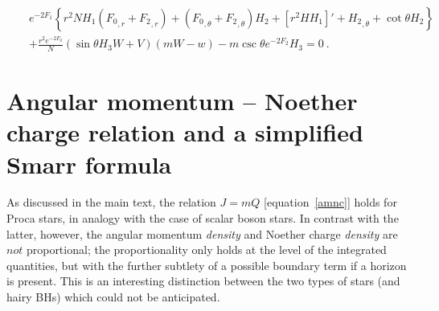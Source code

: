 \documentclass{article}
\numberwithin{equation}{section}
\begin{document}
\begin{eqnarray}
&&
e^{-2 {F_1}} \left\{r^2 N{H_1}( {F_0}_{,r}+ {F_2}_{,r})
+({F_0}_{,\theta} + {F_2}_{,\theta} ){H_2}
+[r^2 H  {H_1}]'
+ {H_2}_{,\theta}
+\cot \theta {H_2}
\right\}
 \nonumber \\
%
&&
+\frac{r^2e^{-2 {F_0}}}{N}
 (\sin \theta  {H_3} W+  V)(mW-w)
-{m} \csc \theta e^{-2 {F_2}} {H_3}=0 \ .
\end{eqnarray}


\section{Angular momentum -- Noether charge relation and 
a simplified Smarr formula}
\label{appendixc}
As discussed in the main text, the relation $J = m Q$ [equation~\eqref{amnc}] holds for Proca stars, in analogy with the case of scalar boson stars. In contrast with the latter, however, the angular momentum \textit{density} and Noether charge \textit{density} are $not$ proportional; the proportionality only holds at the level of the integrated quantities, but with the further subtlety of a possible boundary term if a horizon is present. This is an interesting distinction between the two types of stars (and hairy BHs) which could not be anticipated.
\end{document}
